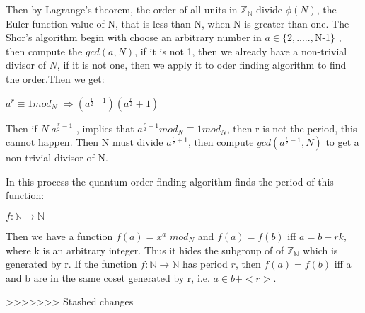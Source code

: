 \documentclass[12pt]{article}
\theoremstyle{plain}
\theoremstyle{definition}
\begin{document}
Then by Lagrange's theorem, the order of all units in $\mathbb{Z_{N}}$ divide $\phi(N)$, the Euler function value of N, that is less than N, when N is greater than one.
The Shor's algorithm begin with choose an arbitrary number in $a\in \{2,.....,$N-1$\}$ ,  then compute the $gcd(a, N)$, if it is not 1, then we already have a non-trivial divisor of $N$, if it is not one, then we apply it to oder finding algorithm to find the order.Then we get:
\begin{center}                      $a^{r}\equiv 1mod_{N}$
    \newline$\Rightarrow (a^{\frac{r}{2}-1})(a^{\frac{r}{2}}+1)$ 
\end{center}  
Then if $N|a^{\frac{r}{2}-1}$ , implies that $a^{\frac{r}{2}-1}mod_{N}\equiv 1mod_{N}$, then r is not the period, this cannot happen.
Then N must divide $a^{\frac{r}{2}+1}$, then compute $gcd(a^{\frac{r}{2}-1},N)$ to get a non-trivial divisor of N.

In this process the quantum order finding algorithm finds the period of this function:
\newline \begin{center}$f: \mathbb{N}\to\mathbb{N}$
\end{center}
Then we have a function $f(a)=x^{a}$ $mod_{N}$ and $f(a)=f(b)$ iff $a=b+rk$, where k is an arbitrary integer. Thus it hides the subgroup of of $\mathbb{Z_{N}}$ which is generated by r. If the function $f: \mathbb{N}\to\mathbb{N}$ has period $r$, then $f(a)=f(b)$ iff a and b are in the same coset generated by r, i.e. $a\in b+<r>$. 

>>>>>>> Stashed changes
\end{document}
